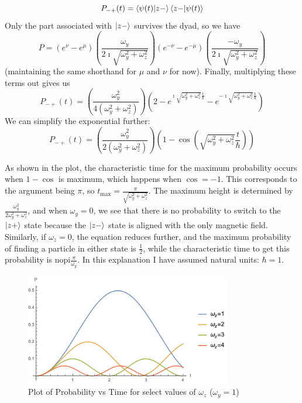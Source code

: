\documentclass[a4paper,twoside]{article}
\begin{document}
\begin{itemize}
\begin{tcolorbox}[breakable]
    \begin{equation}
        P_{-+}(t) = \ip{\psi(t)}{z-}\ip{z-}{\psi(t)}
    \end{equation} 
    Only the part associated with $\ket{z-}$ survives the dyad, so we have
    \begin{equation}
        P = (e^\nu - e^\mu)\left( \frac{\omega_y}{2\imath\sqrt{\omega_y^2+\omega_z^2} } \right) (e^{-\nu} - e^{-\mu})\left( \frac{-\omega_y}{2\imath\sqrt{\omega_y^2+\omega_z^2} } \right)
    \end{equation}
    (maintaining the same shorthand for $\mu$ and $\nu$ for now). Finally, multiplying these terms out gives us
    \begin{equation}
        P_{-+}(t) = \left( \frac{\omega_y^2}{4(\omega_y^2+\omega_z^2)} \right) \left( 2-e^{\imath\sqrt{\omega_y^2+\omega_z^2}\frac{t}{\hbar}} - e^{-\imath\sqrt{\omega_y^2+\omega_z^2}\frac{t}{\hbar}} \right) 
    \end{equation}
    We can simplify the exponential further:
    \begin{equation}
    P_{-+}(t) = \left( \frac{\omega_y^2}{2(\omega_y^2+\omega_z^2)} \right) \left( 1-\cos(\sqrt{\omega_y^2+\omega_z^2}\frac{t}{\hbar})\right)
    \end{equation}

    As shown in the plot, the characteristic time for the maximum probability occurs when $1-\cos$ is maximum, which happens when $\cos = -1$. This corresponds to the argument being $\pi$, so $t_\text{max} = \frac{\pi}{\sqrt{\omega_y^2 + \omega_z^2} }$. The maximum height is determined by $\frac{\omega_y^2}{2\omega_y^2+\omega_z^2}$, and when $\omega_y = 0$, we see that there is no probability to switch to the $\ket{z+}$ state because the $\ket{z-}$ state is aligned with the only magnetic field. Similarly, if $\omega_z = 0$, the equation reduces further, and the maximum probability of finding a particle in either state is $\frac{1}{2}$, while the characteristic time to get this probability is nopi$\frac{\pi}{\omega_y}$. In this explanation I have assumed natural units: $\hbar = 1$.
\end{tcolorbox}
\begin{figure}[h]
    \centering
    \includegraphics[width=0.8\textwidth]{plot_hw3_2f.png}
    \caption{Plot of Probability vs Time for select values of $\omega_z$ ($\omega_y = 1$)}
    \label{fig:plot2f}
\end{figure}
\end{itemize}
\end{document}

